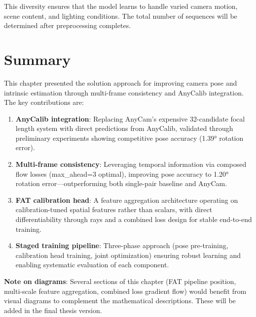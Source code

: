 This diversity ensures that the model learns to handle varied camera motion, scene content, and lighting conditions. The total number of sequences will be determined after preprocessing completes.

\section{Summary}

This chapter presented the solution approach for improving camera pose and intrinsic estimation through multi-frame consistency and AnyCalib integration. The key contributions are:

\begin{enumerate}
    \item \textbf{AnyCalib integration}: Replacing AnyCam's expensive 32-candidate focal length system with direct predictions from AnyCalib, validated through preliminary experiments showing competitive pose accuracy (1.39° rotation error).

    \item \textbf{Multi-frame consistency}: Leveraging temporal information via composed flow losses (max\_ahead=3 optimal), improving pose accuracy to 1.20° rotation error---outperforming both single-pair baseline and AnyCam.

    \item \textbf{FAT calibration head}: A feature aggregation architecture operating on calibration-tuned spatial features rather than scalars, with direct differentiability through rays and a combined loss design for stable end-to-end training.

    \item \textbf{Staged training pipeline}: Three-phase approach (pose pre-training, calibration head training, joint optimization) ensuring robust learning and enabling systematic evaluation of each component.
\end{enumerate}

\textbf{Note on diagrams}: Several sections of this chapter (FAT pipeline position, multi-scale feature aggregation, combined loss gradient flow) would benefit from visual diagrams to complement the mathematical descriptions. These will be added in the final thesis version.
